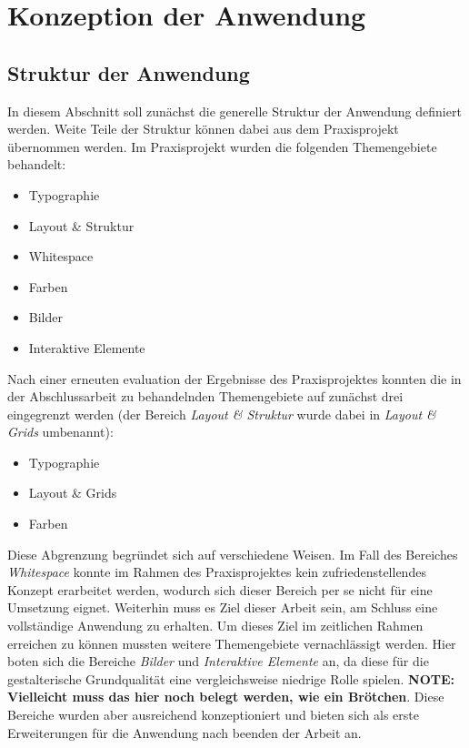 \chapter{Konzeption der Anwendung}
\thispagestyle{fancy}

\section{Struktur der Anwendung}
In diesem Abschnitt soll zunächst die generelle Struktur der Anwendung definiert werden. Weite Teile der Struktur können dabei aus dem Praxisprojekt übernommen werden. Im Praxisprojekt wurden die folgenden Themengebiete behandelt:

\begin{itemize}
  \item Typographie
  \item Layout \& Struktur
  \item Whitespace
  \item Farben
  \item Bilder
  \item Interaktive Elemente
\end{itemize}

Nach einer erneuten evaluation der Ergebnisse des Praxisprojektes konnten die in der Abschlussarbeit zu behandelnden Themengebiete auf zunächst drei eingegrenzt werden (der Bereich \textit{Layout \& Struktur} wurde dabei in \textit{Layout \& Grids} umbenannt):

\begin{itemize}
  \item Typographie
  \item Layout \& Grids
  \item Farben
\end{itemize}

Diese Abgrenzung begründet sich auf verschiedene Weisen. Im Fall des Bereiches \textit{Whitespace} konnte im Rahmen des Praxisprojektes kein zufriedenstellendes Konzept erarbeitet werden, wodurch sich dieser Bereich per se nicht für eine Umsetzung eignet. Weiterhin muss es Ziel dieser Arbeit sein, am Schluss eine vollständige Anwendung zu erhalten. Um dieses Ziel im zeitlichen Rahmen erreichen zu können mussten weitere Themengebiete vernachlässigt werden. Hier boten sich die Bereiche \textit{Bilder} und \textit{Interaktive Elemente} an, da diese für die gestalterische Grundqualität eine vergleichsweise niedrige Rolle spielen. \textbf{NOTE: Vielleicht muss das hier noch belegt werden, wie ein Brötchen}. Diese Bereiche wurden aber ausreichend konzeptioniert und bieten sich als erste Erweiterungen für die Anwendung nach beenden der Arbeit an.

